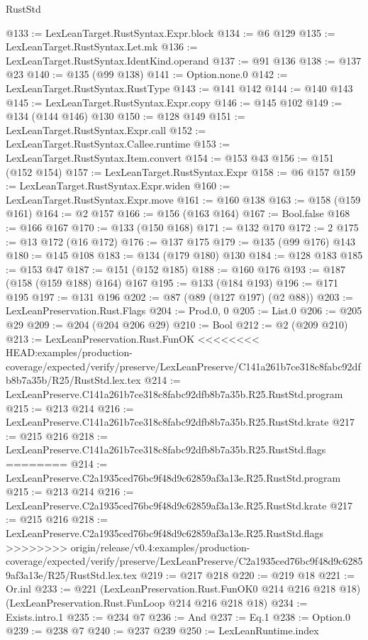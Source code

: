 \begin{lexlean}{RustStd}
\begin{coremodule}
{\begin{coremodule}
{{{{{@133 := LexLeanTarget.RustSyntax.Expr.block
@134 := @6 @129
@135 := LexLeanTarget.RustSyntax.Let.mk
@136 := LexLeanTarget.RustSyntax.IdentKind.operand
@137 := @91 @136
@138 := @137 @23
@140 := @135 (@99 @138)
@141 := Option.none.{0}
@142 := LexLeanTarget.RustSyntax.RustType
@143 := @141 @142
@144 := @140 @143
@145 := LexLeanTarget.RustSyntax.Expr.copy
@146 := @145 @102
@149 := @134 (@144 @146) @130
@150 := @128 @149
@151 := LexLeanTarget.RustSyntax.Expr.call
@152 := LexLeanTarget.RustSyntax.Callee.runtime
@153 := LexLeanTarget.RustSyntax.Item.convert
@154 := @153 @43
@156 := @151 (@152 @154)
@157 := LexLeanTarget.RustSyntax.Expr
@158 := @6 @157
@159 := LexLeanTarget.RustSyntax.Expr.widen
@160 := LexLeanTarget.RustSyntax.Expr.move
@161 := @160 @138
@163 := @158 (@159 @161)
@164 := @2 @157
@166 := @156 (@163 @164)
@167 := Bool.false
@168 := @166 @167
@170 := @133 (@150 @168)
@171 := @132 @170
@172 := 2
@175 := @13 @172 (@16 @172)
@176 := @137 @175
@179 := @135 (@99 @176) @143
@180 := @145 @108
@183 := @134 (@179 @180) @130
@184 := @128 @183
@185 := @153 @47
@187 := @151 (@152 @185)
@188 := @160 @176
@193 := @187 (@158 (@159 @188) @164) @167
@195 := @133 (@184 @193)
@196 := @171 @195
@197 := @131 @196
@202 := @87 (@89 (@127 @197) (@2 @88))
@203 := LexLeanPreservation.Rust.Flags
@204 := Prod.{0, 0}
@205 := List.{0}
@206 := @205 @29
@209 := @204 (@204 @206 @29)
@210 := Bool
@212 := @2 (@209 @210)
@213 := LexLeanPreservation.Rust.FunOK
<<<<<<<< HEAD:examples/production-coverage/expected/verify/preserve/LexLeanPreserve/C141a261b7ce318c8fabc92dfb8b7a35b/R25/RustStd.lex.tex
@214 := LexLeanPreserve.C141a261b7ce318c8fabc92dfb8b7a35b.R25.RustStd.program
@215 := @213 @214
@216 := LexLeanPreserve.C141a261b7ce318c8fabc92dfb8b7a35b.R25.RustStd.krate
@217 := @215 @216
@218 := LexLeanPreserve.C141a261b7ce318c8fabc92dfb8b7a35b.R25.RustStd.flags
========
@214 := LexLeanPreserve.C2a1935ced76bc9f48d9c62859af3a13e.R25.RustStd.program
@215 := @213 @214
@216 := LexLeanPreserve.C2a1935ced76bc9f48d9c62859af3a13e.R25.RustStd.krate
@217 := @215 @216
@218 := LexLeanPreserve.C2a1935ced76bc9f48d9c62859af3a13e.R25.RustStd.flags
>>>>>>>> origin/release/v0.4:examples/production-coverage/expected/verify/preserve/LexLeanPreserve/C2a1935ced76bc9f48d9c62859af3a13e/R25/RustStd.lex.tex
@219 := @217 @218
@220 := @219 @18
@221 := Or.inl
@233 := @221
    (LexLeanPreservation.Rust.FunOK0 @214 @216 @218 @18)
    (LexLeanPreservation.Rust.FunLoop @214 @216 @218 @18)
@234 := Exists.intro.{1}
@235 := @234 @7
@236 := And
@237 := Eq.{1}
@238 := Option.{0}
@239 := @238 @7
@240 := @237 @239
@250 := LexLeanRuntime.index
}}}}}
\end{coremodule}}
\end{coremodule}
\end{lexlean}
